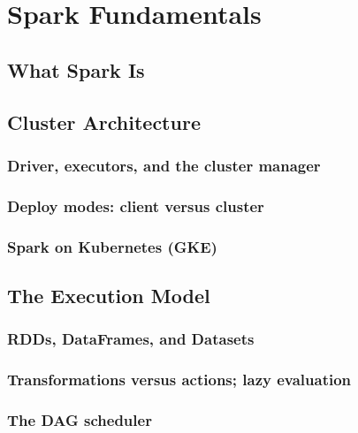 \chapter{Spark Fundamentals}
\label{ch:fundamentals}

\tbd


\section{What Spark Is}
\label{sec:fund-what}
\tbd

\section{Cluster Architecture}
\label{sec:fund-cluster}

\subsection{Driver, executors, and the cluster manager}
\tbd

\subsection{Deploy modes: client versus cluster}
\tbd

\subsection{Spark on Kubernetes (GKE)}
\tbd

\section{The Execution Model}
\label{sec:fund-execution}

\subsection{RDDs, DataFrames, and Datasets}
\tbd

\subsection{Transformations versus actions; lazy evaluation}
\tbd

\subsection{The DAG scheduler}
\tbd

